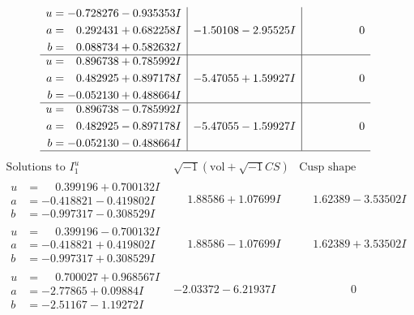 \documentclass[1p]{elsarticle_modified}
\theoremstyle{definition}
\newcommand{\I}{\sqrt{-1}}
\begin{document}
$$\begin{array}{c|c|c}
\begin{aligned}
u &= -0.728276 - 0.935353 I \\
a &= \phantom{-}0.292431 + 0.682258 I \\
b &= \phantom{-}0.088734 + 0.582632 I\end{aligned}
 & -1.50108 - 2.95525 I & \phantom{-0.000000 } 0 \\ \hline\begin{aligned}
u &= \phantom{-}0.896738 + 0.785992 I \\
a &= \phantom{-}0.482925 + 0.897178 I \\
b &= -0.052130 + 0.488664 I\end{aligned}
 & -5.47055 + 1.59927 I & \phantom{-0.000000 } 0 \\ \hline\begin{aligned}
u &= \phantom{-}0.896738 - 0.785992 I \\
a &= \phantom{-}0.482925 - 0.897178 I \\
b &= -0.052130 - 0.488664 I\end{aligned}
 & -5.47055 - 1.59927 I & \phantom{-0.000000 } 0\\
 \hline 
 \end{array}$$\newpage$$\begin{array}{c|c|c}  
\text{Solutions to }I^u_{1}& \I (\text{vol} + \sqrt{-1}CS) & \text{Cusp shape}\\
 \hline 
\begin{aligned}
u &= \phantom{-}0.399196 + 0.700132 I \\
a &= -0.418821 - 0.419802 I \\
b &= -0.997317 - 0.308529 I\end{aligned}
 & \phantom{-}1.88586 + 1.07699 I & \phantom{-}1.62389 - 3.53502 I \\ \hline\begin{aligned}
u &= \phantom{-}0.399196 - 0.700132 I \\
a &= -0.418821 + 0.419802 I \\
b &= -0.997317 + 0.308529 I\end{aligned}
 & \phantom{-}1.88586 - 1.07699 I & \phantom{-}1.62389 + 3.53502 I \\ \hline\begin{aligned}
u &= \phantom{-}0.700027 + 0.968567 I \\
a &= -2.77865 + 0.09884 I \\
b &= -2.51167 - 1.19272 I\end{aligned}
 & -2.03372 - 6.21937 I & \phantom{-0.000000 } 0 \\ \hline\begin{aligned}

\end{aligned}
\end{array}$$
\end{document}
